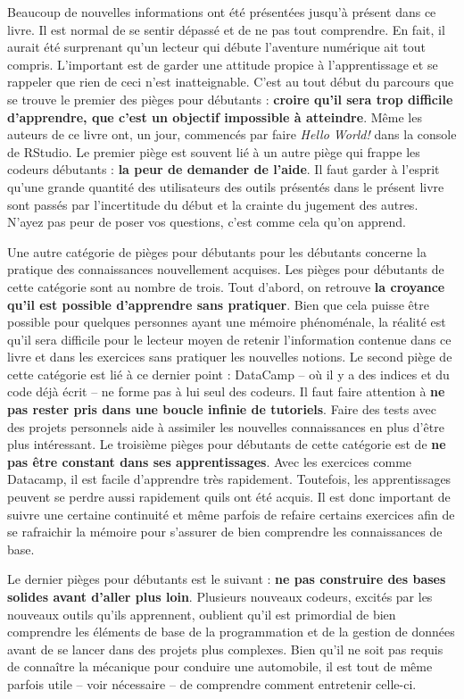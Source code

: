 \documentclass[
  letterpaper,
]{scrbook}
\begin{document}
Beaucoup de nouvelles informations ont été présentées jusqu'à présent
dans ce livre. Il est normal de se sentir dépassé et de ne pas tout
comprendre. En fait, il aurait été surprenant qu'un lecteur qui débute
l'aventure numérique ait tout compris. L'important est de garder une
attitude propice à l'apprentissage et se rappeler que rien de ceci n'est
inatteignable. C'est au tout début du parcours que se trouve le premier
des pièges pour débutants : \textbf{croire qu'il sera trop difficile
d'apprendre, que c'est un objectif impossible à atteindre}. Même les
auteurs de ce livre ont, un jour, commencés par faire \emph{Hello
World!} dans la console de RStudio. Le premier piège est souvent lié à
un autre piège qui frappe les codeurs débutants : \textbf{la peur de
demander de l'aide}. Il faut garder à l'esprit qu'une grande quantité
des utilisateurs des outils présentés dans le présent livre sont passés
par l'incertitude du début et la crainte du jugement des autres. N'ayez
pas peur de poser vos questions, c'est comme cela qu'on apprend.

Une autre catégorie de pièges pour débutants pour les débutants concerne
la pratique des connaissances nouvellement acquises. Les pièges pour
débutants de cette catégorie sont au nombre de trois. Tout d'abord, on
retrouve \textbf{la croyance qu'il est possible d'apprendre sans
pratiquer}. Bien que cela puisse être possible pour quelques personnes
ayant une mémoire phénoménale, la réalité est qu'il sera difficile pour
le lecteur moyen de retenir l'information contenue dans ce livre et dans
les exercices sans pratiquer les nouvelles notions. Le second piège de
cette catégorie est lié à ce dernier point : DataCamp -- où il y a des
indices et du code déjà écrit -- ne forme pas à lui seul des codeurs. Il
faut faire attention à \textbf{ne pas rester pris dans une boucle
infinie de tutoriels}. Faire des tests avec des projets personnels aide
à assimiler les nouvelles connaissances en plus d'être plus intéressant.
Le troisième pièges pour débutants de cette catégorie est de \textbf{ne
pas être constant dans ses apprentissages}. Avec les exercices comme
Datacamp, il est facile d'apprendre très rapidement. Toutefois, les
apprentissages peuvent se perdre aussi rapidement qu\textquotesingle ils
ont été acquis. Il est donc important de suivre une certaine continuité
et même parfois de refaire certains exercices afin de se rafraichir la
mémoire pour s'assurer de bien comprendre les connaissances de base.

Le dernier pièges pour débutants est le suivant : \textbf{ne pas
construire des bases solides avant d'aller plus loin}. Plusieurs
nouveaux codeurs, excités par les nouveaux outils qu'ils apprennent,
oublient qu'il est primordial de bien comprendre les éléments de base de
la programmation et de la gestion de données avant de se lancer dans des
projets plus complexes. Bien qu'il ne soit pas requis de connaître la
mécanique pour conduire une automobile, il est tout de même parfois
utile -- voir nécessaire -- de comprendre comment entretenir celle-ci.
\end{document}
